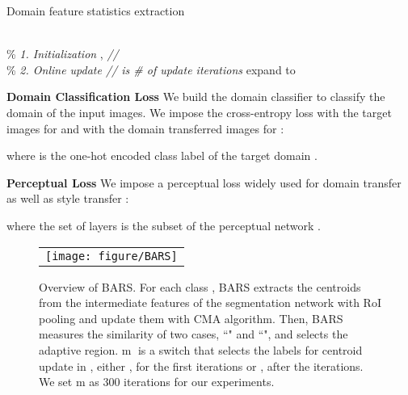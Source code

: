 \begin{algorithm}
\caption{Domain feature statistics extraction}
\label{alg:CMA}
\begin{algorithmic}[1]
 \renewcommand{\algorithmicrequire}{\textbf{Input: }}
 \renewcommand{\algorithmicensure}{\textbf{Update: }}
 \REQUIRE 
 \ENSURE  
 \\ \% \textit{1. Initialization}
  \FOR {} 
  \STATE ,  \textit{ \hfill//}
  \ENDFOR
 \\ \% \textit{2. Online update
  \hfill // is \# of update iterations}
  \FOR {}
\FOR {}
  \STATE 
  \STATE 
  \STATE 
  \STATE   expand  to  
  \IF {}
  \STATE 
  \ELSE
  \STATE 
\STATE
  
  \STATE
  
  \ENDIF
  \ENDFOR
  \ENDFOR
\end{algorithmic}
\end{algorithm}

\noindent\textbf{Domain Classification Loss}
We build the domain classifier  to classify the domain of the input images.
We impose the cross-entropy loss with the target images for  and with the domain transferred images for :

where  is the one-hot encoded class label of the target domain .

\noindent\textbf{Perceptual Loss}
We impose a perceptual loss \cite{johnson2016perceptual} widely used for domain transfer as well as style transfer \cite{dumoulin2016learned, huang2017arbitrary}:

where the set of layers  is the subset of the perceptual network .





\begin{figure}[t] 
	\centering
	\begin{tabular}{c}
    \texttt{[image: figure/BARS]} 
    \end{tabular}
	\caption{Overview of BARS.
	For each class ,
	BARS extracts the centroids  from the intermediate features  of the segmentation network  with RoI pooling and update them with CMA algorithm.
	Then, BARS measures the similarity of two cases, ``" and ``", and selects the adaptive region.
	\textcircled{m} is a switch that selects the labels for centroid update in , either ,  for the first  iterations or ,  after the  iterations. We set m as 300 iterations for our experiments.
	}
\label{fig:BARS}
	\vspace{-3mm}
\end{figure}









